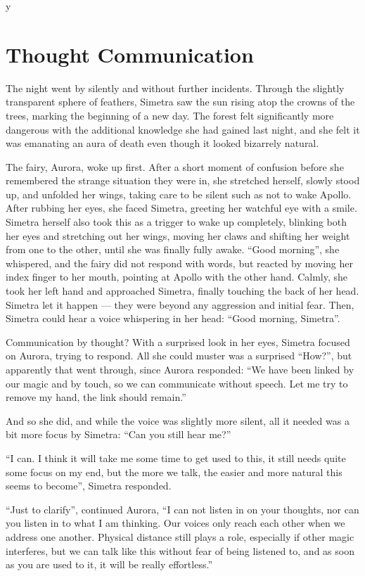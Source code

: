 y\chapter{Thought Communication}
\label{cha:thought-communication}
The night went by silently and without further incidents. Through the slightly transparent sphere of feathers, Simetra saw the sun rising atop the crowns of the trees, marking the beginning of a new day. The forest felt significantly more dangerous with the additional knowledge she had gained last night, and she felt it was emanating an aura of death even though it looked bizarrely natural.

The fairy, Aurora, woke up first. After a short moment of confusion before she remembered the strange situation they were in, she stretched herself, slowly stood up, and unfolded her wings, taking care to be silent such as not to wake Apollo. After rubbing her eyes, she faced Simetra, greeting her watchful eye with a smile. Simetra herself also took this as a trigger to wake up completely, blinking both her eyes and stretching out her wings, moving her claws and shifting her weight from one to the other, until she was finally fully awake. \enquote{Good morning}, she whispered, and the fairy did not respond with words, but reacted by moving her index finger to her mouth, pointing at Apollo with the other hand. Calmly, she took her left hand and approached Simetra, finally touching the back of her head. Simetra let it happen --- they were beyond any aggression and initial fear. Then, Simetra could hear a voice whispering in her head: \enquote{Good morning, Simetra}.

Communication by thought? With a surprised look in her eyes, Simetra focused on Aurora, trying to respond. All she could muster was a surprised \enquote{How?}, but apparently that went through, since Aurora responded: \enquote{We have been linked by our magic and by touch, so we can communicate without speech. Let me try to remove my hand, the link should remain.}

And so she did, and while the voice was slightly more silent, all it needed was a bit more focus by Simetra: \enquote{Can you still hear me?}

\enquote{I can. I think it will take me some time to get used to this, it still needs quite some focus on my end, but the more we talk, the easier and more natural this seems to become}, Simetra responded.

\enquote{Just to clarify}, continued Aurora, \enquote{I can not listen in on your thoughts, nor can you listen in to what I am thinking. Our voices only reach each other when we address one another. Physical distance still plays a role, especially if other magic interferes, but we can talk like this without fear of being listened to, and as soon as you are used to it, it will be really effortless.}

